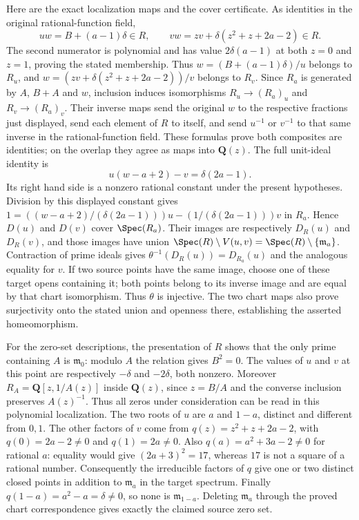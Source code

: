 \begin{example}
\medskip\noindent
Here are the exact localization maps and the cover certificate.
As identities in the original rational-function field,
$$
uw=B+(a-1)\delta\in R,
\qquad
vw=zv+\delta(z^2+z+2a-2)\in R.
$$
The second numerator is polynomial and has value
$2\delta(a-1)$ at both $z=0$ and $z=1$, proving the stated membership.
Thus $w=(B+(a-1)\delta)/u$ belongs to $R_u$, and
$w=(zv+\delta(z^2+z+2a-2))/v$ belongs to $R_v$.
Since $R_a$ is generated by $A$, $B+A$ and $w$, inclusion induces
isomorphisms
$R_u\to(R_a)_u$ and $R_v\to(R_a)_v$.
Their inverse maps send the original $w$ to the respective fractions
just displayed, send each element of $R$ to itself, and send
$u^{-1}$ or $v^{-1}$ to that same inverse in the rational-function field.
These formulas prove both composites are identities; on the overlap
they agree as maps into $\mathbf Q(z)$.
The full unit-ideal identity is
$$
u(w-a+2)-v=\delta(2a-1).
$$
Its right hand side is a nonzero rational constant under the present
hypotheses. Division by this displayed constant gives
$1=((w-a+2)/(\delta(2a-1)))u-(1/(\delta(2a-1)))v$ in $R_a$.
Hence $D(u)$ and $D(v)$ cover $\Spec(R_a)$.
Their images are respectively $D_R(u)$ and $D_R(v)$, and those images
have union $\Spec(R)\setminus V(u,v)=\Spec(R)\setminus\{\mathfrak m_a\}$.
Contraction of prime ideals gives
$\theta^{-1}(D_R(u))=D_{R_a}(u)$ and the analogous equality for $v$.
If two source points have the same image, choose one of these target
opens containing it; both points belong to its inverse image and
are equal by that chart isomorphism. Thus $\theta$ is injective.
The two chart maps also prove surjectivity onto the stated union and
openness there, establishing the asserted homeomorphism.

\medskip\noindent
For the zero-set descriptions, the presentation of $R$ shows that the
only prime containing $A$ is $\mathfrak m_0$: modulo $A$ the relation
gives $B^2=0$. The values of $u$ and $v$ at this point are respectively
$-\delta$ and $-2\delta$, both nonzero.
Moreover $R_A=\mathbf Q[z,1/A(z)]$ inside $\mathbf Q(z)$, since
$z=B/A$ and the converse inclusion preserves $A(z)^{-1}$.
Thus all zeros under consideration can be read in this polynomial
localization. The two roots of $u$ are $a$ and $1-a$, distinct and
different from $0,1$. The other factors of $v$ come from
$q(z)=z^2+z+2a-2$, with $q(0)=2a-2\ne0$ and $q(1)=2a\ne0$.
Also $q(a)=a^2+3a-2\ne0$ for rational $a$: equality would give
$(2a+3)^2=17$, whereas $17$ is not a square of a rational number.
Consequently the irreducible factors of $q$ give one or two distinct
closed points in addition to $\mathfrak m_a$ in the target spectrum.
Finally $q(1-a)=a^2-a=\delta\ne0$, so none is $\mathfrak m_{1-a}$.
Deleting $\mathfrak m_a$ through the proved chart correspondence
gives exactly the claimed source zero set.


\end{example}
